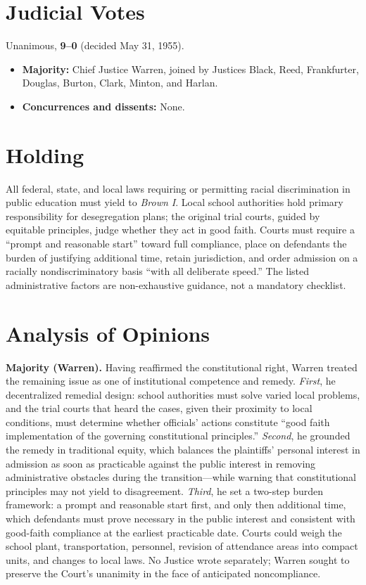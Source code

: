 \documentclass[12pt]{article}
\begin{document}
\section{Judicial Votes}

Unanimous, \textbf{9--0} (decided May 31, 1955).
\begin{itemize}
\item \textbf{Majority:} Chief Justice Warren, joined by Justices Black, Reed, Frankfurter, Douglas, Burton, Clark, Minton, and Harlan.
\item \textbf{Concurrences and dissents:} None.
\end{itemize}

\section{Holding}

All federal, state, and local laws requiring or permitting racial discrimination in public education must yield to \textit{Brown I}. Local school authorities hold primary responsibility for desegregation plans; the original trial courts, guided by equitable principles, judge whether they act in good faith. Courts must require a ``prompt and reasonable start'' toward full compliance, place on defendants the burden of justifying additional time, retain jurisdiction, and order admission on a racially nondiscriminatory basis ``with all deliberate speed.'' The listed administrative factors are non-exhaustive guidance, not a mandatory checklist.

\section{Analysis of Opinions}

\textbf{Majority (Warren).} Having reaffirmed the constitutional right, Warren treated the remaining issue as one of institutional competence and remedy. \emph{First}, he decentralized remedial design: school authorities must solve varied local problems, and the trial courts that heard the cases, given their proximity to local conditions, must determine whether officials' actions constitute ``good faith implementation of the governing constitutional principles.'' \emph{Second}, he grounded the remedy in traditional equity, which balances the plaintiffs' personal interest in admission as soon as practicable against the public interest in removing administrative obstacles during the transition---while warning that constitutional principles may not yield to disagreement. \emph{Third}, he set a two-step burden framework: a prompt and reasonable start first, and only then additional time, which defendants must prove necessary in the public interest and consistent with good-faith compliance at the earliest practicable date. Courts could weigh the school plant, transportation, personnel, revision of attendance areas into compact units, and changes to local laws. No Justice wrote separately; Warren sought to preserve the Court's unanimity in the face of anticipated noncompliance.
\end{document}
